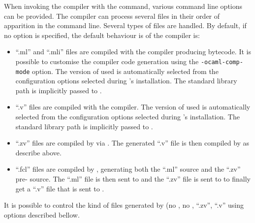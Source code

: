 

\label{compiler-options}
When invoking the {\focal} compiler with the {\focalizec} command,
various command line options can be provided. The compiler can process
several files in their order of apparition in the command line.
Several types of files are handled. By default, if no option is
specified, the default behaviour is of the compiler is:
\begin{itemize}
  \item ``.ml'' and ``.mli'' files are compiled with the {\ocaml}
    compiler producing bytecode. It is possible to customise the
    compiler code generation using the {\tt -ocaml-comp-mode} option.
    The version of {\ocaml} used is automatically selected from the
    configuration options selected during {\focal}'s
    installation. The {\focal} standard library path is implicitly
    passed to {\ocaml}.
    \item ``.v'' files are compiled with the {\coq} compiler. The
      version of {\coq} used is automatically selected from the
      configuration options selected during {\focal}'s installation.
      The {\focal} standard library path is implicitly passed to
      {\coq}.
    \item ``.zv'' files are compiled by {\zenon} via {\zvtov}. The
      generated ``.v'' file is then compiled by {\coq} as describe
      above.
    \item ``.fcl'' files are compiled by {\focalizec}, generating both
      the ``.ml'' {\ocaml} source and the ``.zv'' pre-{\coq} source. The
      ``.ml'' file is then sent to {\ocaml} and the ``.zv'' file is sent
      to {\zenon} to finally get a ``.v'' file that is sent to {\coq}.
\end{itemize}
It is possible to control the kind of files generated by
{\focalizec} (no {\coq}, no {\ocaml}, ``.zv'', ``.v'' using options
described bellow.

